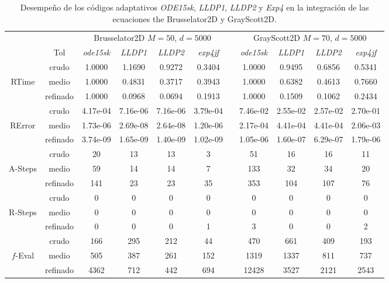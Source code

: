 \begin{table}
	\caption{Desempeño de los códigos adaptativos \emph{ODE15sk}, \emph{LLDP1}, \emph{LLDP2} y \emph{Exp4} en la integración de las ecuaciones the Brusselator2D y GrayScott2D.}
	\label{tab:bruss2DGrayScott}
	\begin{adjustbox}{width=0.95\columnwidth,center}
		\begin{tabular}{ccccccccccc}
			\hline
			&  & \multicolumn{4}{c}{Brusselator2D $M=50$, $d=5000$} &  & \multicolumn{4}{c}{GrayScott2D $M=70$, $d=5000$} \\
			\cline{3-6}\cline{8-11} & Tol & \emph{ode15sk} & \emph{LLDP1} & \emph{LLDP2} & \emph{exp4jf} &  & \emph{ode15sk} & \emph{LLDP1} & \emph{LLDP2} & \emph{exp4jf} \\
			\hline
			& crudo & 1.0000 & 1.1690 & 0.9272 & 0.3404 &  & 1.0000 & 0.9495 & 0.6856 & 0.5341 \\
			RTime & medio & 1.0000 & 0.4831 & 0.3717 & 0.3943 &  & 1.0000 & 0.6382 & 0.4613 & 0.7660 \\
			& refinado & 1.0000 & 0.0968 & 0.0694 & 0.1913 &  & 1.0000 & 0.1509 & 0.1062 & 0.2434 \\
			\hline
			& crudo & 4.17e-04 & 7.16e-06 & 7.16e-06 & 3.79e-04 &  & 7.46e-02 & 2.55e-02 & 2.57e-02 & 2.70e-01 \\
			RError & medio & 1.73e-06 & 2.69e-08 & 2.64e-08 & 1.20e-06 &  & 2.17e-04 & 4.41e-04 & 4.41e-04 & 2.06e-03 \\
			& refinado & 3.74e-09 & 1.65e-09 & 1.40e-09 & 1.02e-09 &  & 1.05e-06 & 1.60e-07 & 6.29e-07 & 1.79e-06 \\
			\hline
			& crudo & 20 & 13 & 13 & 3 &  & 51 & 16 & 16 & 11 \\
			A-Steps & medio & 59 & 14 & 14 & 7 &  & 133 & 32 & 34 & 20 \\
			& refinado & 141 & 23 & 23 & 35 &  & 353 & 104 & 107 & 76 \\
			\hline
			& crudo & 0 & 0 & 0 & 0 &  & 0 & 0 & 0 & 0 \\
			R-Steps & medio & 0 & 0 & 0 & 0 &  & 0 & 0 & 0 & 0 \\
			& refinado & 0 & 0 & 0 & 1 &  & 3 & 0 & 0 & 2 \\
			\hline
			& crudo & 166 & 295 & 212 & 44 &  & 470 & 661 & 409 & 193 \\
			$f$-Eval & medio & 505 & 387 & 261 & 152 &  & 1319 & 1337 & 811 & 737 \\
			& refinado & 4362 & 712 & 442 & 694 &  & 12428 & 3527 & 2121 & 2543 \\
			\hline

\end{tabular}
\end{adjustbox}
\end{table}

